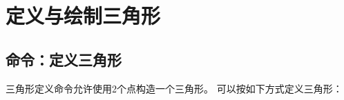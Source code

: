 \documentclass[../main.tex]{subfiles}
\begin{document}
\section{定义与绘制三角形}

\subsection{命令：定义三角形}
三角形定义命令允许使用2个点构造一个三角形。
可以按如下方式定义三角形：
%
%
%
%
%
%
%
\end{document}
